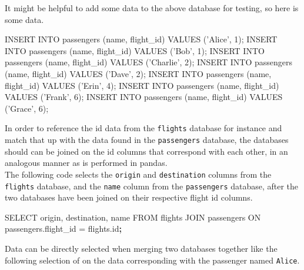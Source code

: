 \documentclass[]{book}
\newenvironment{Shaded}{\begin{snugshade}}{\end{snugshade}}
\newcommand{\KeywordTok}[1]{\textcolor[rgb]{0.13,0.29,0.53}{\textbf{#1}}}
\newcommand{\StringTok}[1]{\textcolor[rgb]{0.31,0.60,0.02}{#1}}
\newcommand{\ExtensionTok}[1]{#1}
\newcommand{\NormalTok}[1]{#1}
\begin{document}
It might be helpful to add some data to the above database for testing,
so here is some data.

\begin{Shaded}
\begin{Highlighting}[]
\ExtensionTok{INSERT}\NormalTok{ INTO passengers (name, flight_id) }\ExtensionTok{VALUES}\NormalTok{ (}\StringTok{'Alice'}\NormalTok{, 1);  }
\ExtensionTok{INSERT}\NormalTok{ INTO passengers (name, flight_id) }\ExtensionTok{VALUES}\NormalTok{ (}\StringTok{'Bob'}\NormalTok{, 1);    }
\ExtensionTok{INSERT}\NormalTok{ INTO passengers (name, flight_id) }\ExtensionTok{VALUES}\NormalTok{ (}\StringTok{'Charlie'}\NormalTok{, 2);}
\ExtensionTok{INSERT}\NormalTok{ INTO passengers (name, flight_id) }\ExtensionTok{VALUES}\NormalTok{ (}\StringTok{'Dave'}\NormalTok{, 2);   }
\ExtensionTok{INSERT}\NormalTok{ INTO passengers (name, flight_id) }\ExtensionTok{VALUES}\NormalTok{ (}\StringTok{'Erin'}\NormalTok{, 4);   }
\ExtensionTok{INSERT}\NormalTok{ INTO passengers (name, flight_id) }\ExtensionTok{VALUES}\NormalTok{ (}\StringTok{'Frank'}\NormalTok{, 6);  }
\ExtensionTok{INSERT}\NormalTok{ INTO passengers (name, flight_id) }\ExtensionTok{VALUES}\NormalTok{ (}\StringTok{'Grace'}\NormalTok{, 6);  }
\end{Highlighting}
\end{Shaded}

In order to reference the id data from the \texttt{flights} database for
instance and match that up with the data found in the
\texttt{passengers} database, the databases should can be joined on the
id columns that correspond with each other, in an analogous manner as is
performed in pandas.\\
The following code selects the \texttt{origin} and \texttt{destination}
columns from the \texttt{flights} database, and the \texttt{name} column
from the \texttt{passengers} database, after the two databases have been
joined on their respective flight id columns.

\begin{Shaded}
\begin{Highlighting}[]
\ExtensionTok{SELECT}\NormalTok{ origin, destination, name FROM flights JOIN passengers ON passengers.flight_id = flights.id}\KeywordTok{;}
\end{Highlighting}
\end{Shaded}

Data can be directly selected when merging two databases together like
the following selection of on the data corresponding with the passenger
named \texttt{Alice}.
\end{document}
